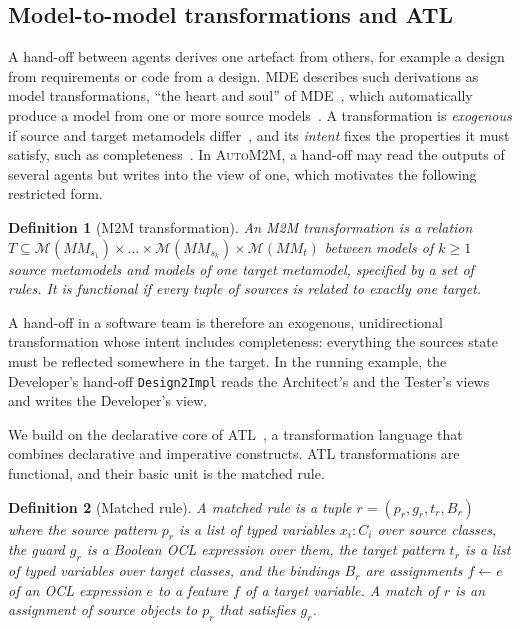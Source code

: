 \documentclass[pdflatex,sn-mathphys-num]{sn-jnl}
\theoremstyle{thmstyleone}%
\theoremstyle{thmstyletwo}%
\theoremstyle{thmstylethree}%
\newtheorem{definition}{Definition}%
\newcommand{\auto}{\textsc{AutoM2M}}
\newcommand{\MM}{\mathit{MM}}
\newcommand{\Mods}[1]{\mathcal{M}(#1)}
\newcommand{\code}[1]{\texttt{#1}}
\begin{document}
\subsection{Model-to-model transformations and ATL}\label{sec:bg-m2m}

A hand-off between agents derives one artefact from others, for example a
design from requirements or code from a design. MDE describes such derivations
as model transformations, ``the heart and soul'' of
MDE~\cite{sendall2003heart}, which automatically produce a model from one or
more source models~\cite{hoppner2022mtl,czarnecki2006survey}. A transformation
is \emph{exogenous} if source and target metamodels
differ~\cite{mens2006taxonomy}, and its \emph{intent} fixes the properties it
must satisfy, such as completeness~\cite{lucio2016intents}. In \auto{}, a
hand-off may read the outputs of several agents but writes into the view of
one, which motivates the following restricted form.

\begin{definition}[M2M transformation]\label{def:m2m}
An M2M transformation is a relation
$T\subseteq\Mods{\MM_{s_1}}\times\dots\times\Mods{\MM_{s_k}}\times\Mods{\MM_t}$
between models of $k\ge1$ source metamodels and models of one target metamodel,
specified by a set of rules. It is \emph{functional} if every tuple of sources
is related to exactly one target.
\end{definition}

A hand-off in a software team is therefore an exogenous, unidirectional
transformation whose intent includes completeness: everything the sources state
must be reflected somewhere in the target. In the running example, the
Developer's hand-off \code{Design2Impl} reads the Architect's and the Tester's
views and writes the Developer's view.

We build on the declarative core of
ATL~\cite{jouault2008atl,jouault2006transforming}, a transformation language
that combines declarative and imperative constructs. ATL transformations are
functional, and their basic unit is the matched rule.

\begin{definition}[Matched rule]\label{def:rule}
A matched rule is a tuple $r=(p_r,g_r,t_r,B_r)$ where the \emph{source pattern}
$p_r$ is a list of typed variables $x_i:C_i$ over source classes, the
\emph{guard} $g_r$ is a Boolean OCL expression over them, the \emph{target
pattern} $t_r$ is a list of typed variables over target classes, and the
\emph{bindings} $B_r$ are assignments $f\leftarrow e$ of an OCL expression $e$ to
a feature $f$ of a target variable. A \emph{match} of $r$ is an assignment of
source objects to $p_r$ that satisfies $g_r$.
\end{definition}
\end{document}
